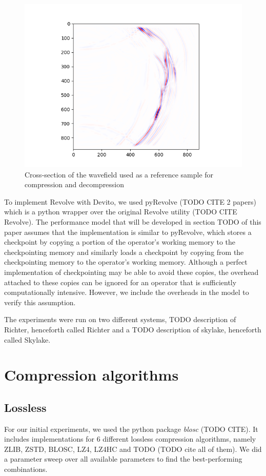 \documentclass[conference]{IEEEtran}
\begin{document}
\begin{figure}
\begin{center}
\includegraphics[width=0.8\linewidth]{images/uncompressed.png}
\end{center}
\caption{Cross-section of the wavefield used as a reference sample for compression and decompression}
\label{fig:uncompressed}
\end{figure}

To implement Revolve with Devito, we used pyRevolve (TODO CITE 2 papers) which is a python wrapper over the
original Revolve utility (TODO CITE Revolve). The performance model that will be developed in section TODO of
this paper assumes that the implementation is similar to pyRevolve, which stores a checkpoint by copying a portion
of the operator's working memory to the checkpointing memory and similarly loads a checkpoint by copying from the
checkpointing memory to the operator's working memory. Although a perfect implementation of checkpointing may
be able to avoid these copies, the overhead attached to these copies can be ignored for an operator that is
sufficiently computationally intensive. However, we include the overheads in the model to verify this assumption. 

The experiments were run on two different systems, TODO description of Richter, henceforth called Richter and a
TODO description of skylake, henceforth called Skylake.


\section{Compression algorithms}
\subsection{Lossless}
For our initial experiments, we used the python package \emph{blosc} (TODO CITE). It includes implementations for
6 different lossless compression algorithms, namely ZLIB, ZSTD, BLOSC, LZ4, LZ4HC and TODO (TODO cite all of them).
We did a parameter sweep over all available parameters to find the best-performing combinations. 
\end{document}
